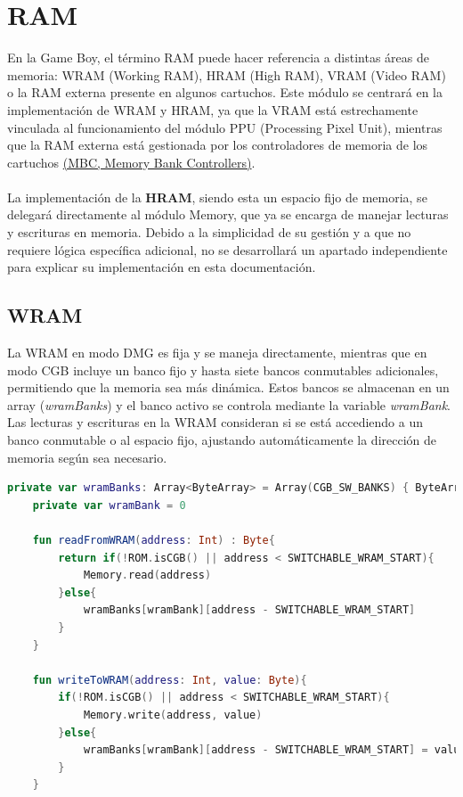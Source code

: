 \section{RAM}

En la Game Boy, el término RAM puede hacer referencia a distintas áreas de memoria: WRAM (Working RAM), HRAM (High RAM), VRAM (Video RAM) o la RAM externa presente en algunos cartuchos. Este módulo se centrará en la implementación de WRAM y HRAM, ya que la VRAM está estrechamente vinculada al funcionamiento del módulo PPU (Processing Pixel Unit), mientras que la RAM externa está gestionada por los controladores de memoria de los cartuchos \hyperref[history_mbcs]{(MBC, Memory Bank Controllers)}.
\\\\
La implementación de la \textbf{HRAM}, siendo esta un espacio fijo de memoria, se delegará directamente al módulo Memory, que ya se encarga de manejar lecturas y escrituras en memoria. Debido a la simplicidad de su gestión y a que no requiere lógica específica adicional, no se desarrollará un apartado independiente para explicar su implementación en esta documentación.

\subsection{WRAM}
La WRAM en modo DMG es fija y se maneja directamente, mientras que en modo CGB incluye un banco fijo y hasta siete bancos conmutables adicionales, permitiendo que la memoria sea más dinámica. Estos bancos se almacenan en un array (\textit{wramBanks}) y el banco activo se controla mediante la variable \textit{wramBank}. Las lecturas y escrituras en la WRAM consideran si se está accediendo a un banco conmutable o al espacio fijo, ajustando automáticamente la dirección de memoria según sea necesario.

\begin{lstlisting}[language=Kotlin, caption={Lectura y escritura en Work RAM.}, label={code:wramreadwrite}]
    private var wramBanks: Array<ByteArray> = Array(CGB_SW_BANKS) { ByteArray(ECHO_RAM_START - SWITCHABLE_WRAM_START) } // Not used if not in CGB mode
    private var wramBank = 0

    fun readFromWRAM(address: Int) : Byte{
        return if(!ROM.isCGB() || address < SWITCHABLE_WRAM_START){
            Memory.read(address)
        }else{
            wramBanks[wramBank][address - SWITCHABLE_WRAM_START]
        }
    }

    fun writeToWRAM(address: Int, value: Byte){
        if(!ROM.isCGB() || address < SWITCHABLE_WRAM_START){
            Memory.write(address, value)
        }else{
            wramBanks[wramBank][address - SWITCHABLE_WRAM_START] = value
        }
    }
\end{lstlisting}

